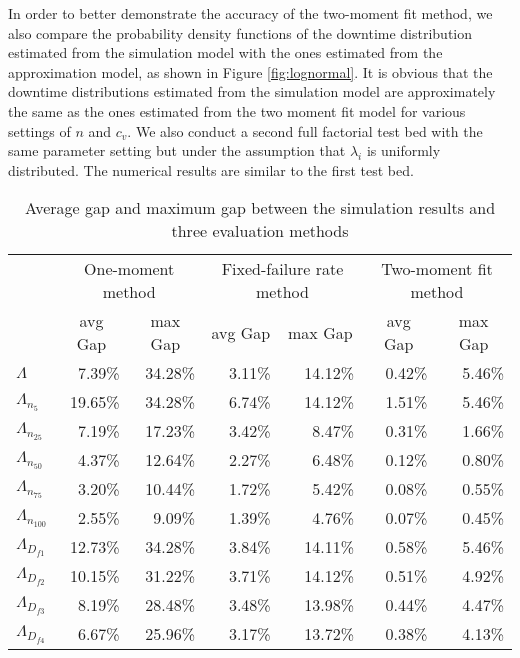 \documentclass[preprint,12pt]{elsarticle}
\begin{document}
   In order to better demonstrate the accuracy of the two-moment fit method, we also compare the probability density functions of the downtime distribution estimated from the simulation model with the ones estimated from the approximation model, as shown in Figure \ref{fig:lognormal}. It is obvious that the downtime distributions estimated from the simulation model are approximately the same as the ones estimated from the two moment fit model for various settings of $n$ and $c_{v}$. We also conduct a second full factorial test bed with the same parameter setting but under the assumption that $\lambda_{i}$ is uniformly distributed. The numerical results are similar to the first test bed.
\begin{table}[htbp]
\small
  \centering
    \caption{Average gap and maximum gap between the simulation results and three evaluation methods}
    \begin{tabular}{lrrrrrr}
    \toprule
    & \multicolumn{2}{c}{One-moment method} & \multicolumn{2}{c}{Fixed-failure rate method} & \multicolumn{2}{c}{Two-moment fit method}  \\
    & \multicolumn{1}{c}{avg Gap} & \multicolumn{1}{c}{max Gap} & \multicolumn{1}{c}{avg Gap} & \multicolumn{1}{c}{max Gap} & \multicolumn{1}{c}{avg Gap} & \multicolumn{1}{c}{max Gap} \\
    \midrule
    $\Lambda$ & 7.39\% & 34.28\% & 3.11\% & 14.12\% & 0.42\% & 5.46\% \\
    $\Lambda_{n_{5}}$ & 19.65\% & 34.28\% & 6.74\% & 14.12\% & 1.51\% & 5.46\% \\
    $\Lambda_{n_{25}}$ & 7.19\% & 17.23\% & 3.42\% & 8.47\% & 0.31\% & 1.66\% \\
    $\Lambda_{n_{50}}$ & 4.37\% & 12.64\% & 2.27\% & 6.48\% & 0.12\% & 0.80\% \\
    $\Lambda_{n_{75}}$ & 3.20\% & 10.44\% & 1.72\% & 5.42\% & 0.08\% & 0.55\% \\
    $\Lambda_{n_{100}}$ & 2.55\% & 9.09\% & 1.39\% & 4.76\% & 0.07\% & 0.45\% \\
    $\Lambda_{D_{f1}}$ & 12.73\% & 34.28\% & 3.84\% & 14.11\% & 0.58\% & 5.46\% \\
    $\Lambda_{D_{f2}}$ & 10.15\% & 31.22\% & 3.71\% & 14.12\% & 0.51\% & 4.92\% \\
    $\Lambda_{D_{f3}}$ & 8.19\% & 28.48\% & 3.48\% & 13.98\% & 0.44\% & 4.47\% \\
    $\Lambda_{D_{f4}}$ & 6.67\% & 25.96\% & 3.17\% & 13.72\% & 0.38\% & 4.13\% \\

\end{tabular}
\end{table}
\end{document}
